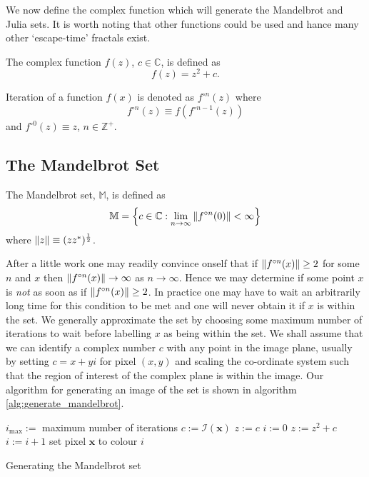 We now define the complex function which will generate the Mandelbrot and
Julia sets\cite{FRAC:Mandelbrot, FRAC:JuliaMandelBook}. It is worth noting
that other functions could be used and hance many other `escape-time' fractals
exist.

\begin{definition}
The complex function $f(z)$, $c \in {\mathbb C}$,
    is defined as
\[
f(z) = z^2 + c.
\]
\end{definition}

\begin{definition}[Iteration]
Iteration of a function $f(x)$ is denoted as $f^{\circ n}(z)$ where
\[
f^{\circ n}(z) \equiv f(f^{\circ n-1}(z))
\]
and $f^{\circ 0}(z) \equiv z$, $n \in {\mathbb Z}^+$.
\end{definition}

\subsection{The Mandelbrot Set}

\begin{definition}
The Mandelbrot set, $\mathbb{M}$, is defined as
\[
\mathbb{M} = 
\left\{c \in \mathbb{C} 
: \lim_{n \rightarrow \infty} \left\Vert f^{\circ n}(0) \right\Vert < \infty \right\} 
\]
where $\left\Vert z \right\Vert \equiv (zz^*)^\frac{1}{2}$.
\end{definition}

After a little work one may readily convince onself that if $\left\Vert f^{\circ n}(x) \right\Vert \ge 2$
for some $n$ and $x$ then $\left\Vert f^{\circ n}(x) \right\Vert \rightarrow \infty$ as $n \rightarrow \infty$.
Hence we may determine if some point $x$ is \emph{not} as soon as if $\left\Vert f^{\circ n}(x) \right\Vert \ge 2$. 
In practice one may have to wait an arbitrarily long time for this condition to be met
and one will never obtain it if $x$ is within the set. We generally approximate the
set by choosing some maximum number of iterations to wait before labelling
$x$ as being within the set. We shall assume that we can identify a complex number $c$ 
with any point in the image plane, usually by setting $c = x + yi$ for pixel
$(x,y)$ and scaling the co-ordinate system such that the region of interest of
the complex plane is within the image.  Our algorithm for generating an image of the
set is shown in algorithm \ref{alg:generate_mandelbrot}.

\begin{fancyalg}
\begin{algorithmic}[1]
\STATE $i_{\mbox{max}} :=$ maximum number of iterations
\STATE $c := {\mathcal I}(\mathbf{x})$
\STATE $z := c$
\STATE $i := 0$
  \STATE $z := z^2 + c$
  \STATE $i := i+1$
\ENDWHILE 
\STATE set pixel $\mathbf{x}$ to colour $i$
\ENDFOR
\end{algorithmic}
\caption{
\label{alg:generate_mandelbrot}
  Generating the Mandelbrot set}
\end{fancyalg}

